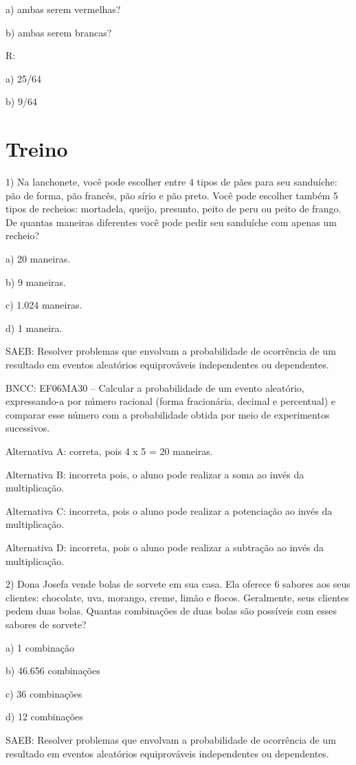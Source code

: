 a) ambas serem vermelhas?

b) ambas serem brancas?

R:

a) 25/64

b) 9/64

\section{Treino}

1) Na lanchonete, você pode escolher entre 4 tipos de pães para seu
sanduíche: pão de forma, pão francês, pão sírio e pão preto. Você pode
escolher também 5 tipos de recheios: mortadela, queijo, presunto, peito
de peru ou peito de frango. De quantas maneiras diferentes você pode
pedir seu sanduíche com apenas um recheio?

a) 20 maneiras.

b) 9 maneiras.

c) 1.024 maneiras.

d) 1 maneira.

SAEB: Resolver problemas que envolvam a probabilidade de ocorrência de
um resultado em eventos aleatórios equiprováveis independentes ou
dependentes.

BNCC: EF06MA30 -- Calcular a probabilidade de um evento aleatório,
expressando-a por número racional (forma fracionária, decimal e
percentual) e comparar esse número com a probabilidade obtida por meio
de experimentos sucessivos.

Alternativa A: correta, pois 4 x 5 = 20 maneiras.

Alternativa B: incorreta pois, o aluno pode realizar a soma ao invés da
multiplicação.

Alternativa C: incorreta, pois o aluno pode realizar a potenciação ao
invés da multiplicação.

Alternativa D: incorreta, pois o aluno pode realizar a subtração ao
invés da multiplicação.

2) Dona Josefa vende bolas de sorvete em sua casa. Ela oferece 6 sabores
aos seus clientes: chocolate, uva, morango, creme, limão e flocos.
Geralmente, seus clientes pedem duas bolas. Quantas combinações de duas
bolas são possíveis com esses sabores de sorvete?

a) 1 combinação

b) 46.656 combinações

c) 36 combinações

d) 12 combinações

SAEB: Resolver problemas que envolvam a probabilidade de ocorrência de
um resultado em eventos aleatórios equiprováveis independentes ou
dependentes.

